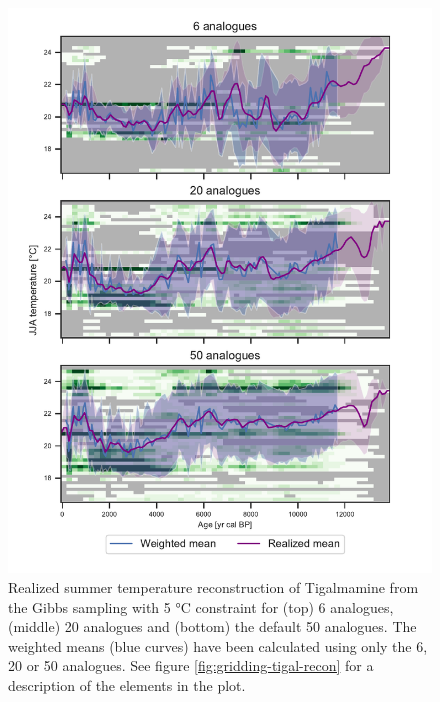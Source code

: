 \begin{refsection}
\begin{figure}
\includegraphics[width=\linewidth]{gridding-figures/realized-temperature-tigalmamine-kanalogues.pdf}
\caption[Realized summer temperature reconstruction of Tigalmamine with different analogues]{Realized summer temperature reconstruction of Tigalmamine from the Gibbs sampling with 5 °C constraint for (top) 6 analogues, (middle) 20 analogues and (bottom) the default 50 analogues. The weighted means (blue curves) have been calculated using only the 6, 20 or 50 analogues. See figure \ref{fig:gridding-tigal-recon} for a description of the elements in the plot.}
\label{fig:gridding-tigal-recon-k}
\end{figure}


\end{refsection}
